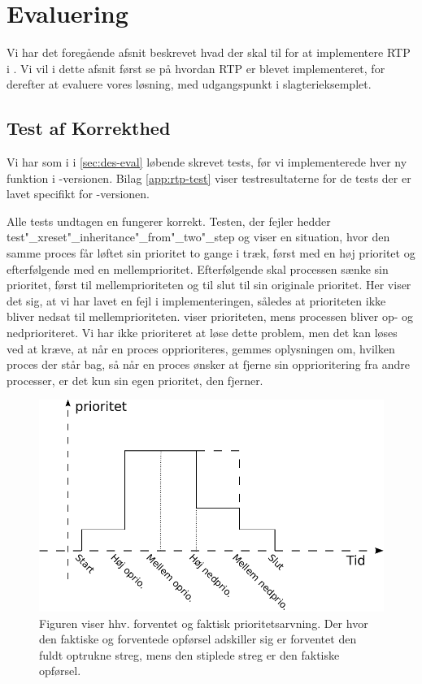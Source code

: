 \section{Evaluering}
Vi har  det foregående afsnit beskrevet hvad der skal til for at implementere RTP i \pycsp. Vi vil i dette afsnit først se på hvordan RTP er blevet implementeret, for derefter at evaluere vores løsning, med udgangspunkt i slagterieksemplet.
\subsection{Test af Korrekthed}
Vi har som i \des i \cref{sec:des-eval} løbende skrevet tests, før vi implementerede hver ny funktion i -versionen.  Bilag \ref{app:rtp-test} viser testresultaterne for de tests der er lavet specifikt for -versionen.

 Alle tests undtagen en fungerer korrekt. Testen, der fejler hedder test"_xreset"_inheritance"_from"_two"_step og viser en situation, hvor den samme proces får løftet sin prioritet to gange i træk, først med en høj prioritet og efterfølgende med en mellemprioritet. Efterfølgende skal processen sænke sin prioritet, først til  mellemprioriteten og til slut til sin originale prioritet. Her viser det sig, at vi har lavet en fejl i implementeringen, således at prioriteten ikke bliver nedsat til mellemprioriteten.  viser prioriteten, mens processen bliver op- og nedprioriteret. Vi har ikke prioriteret at løse dette problem, men det kan løses ved at kræve, at når en proces opprioriteres, gemmes oplysningen om, hvilken proces der står bag, så når en proces ønsker at fjerne sin opprioritering fra andre processer, er det kun sin egen  prioritet, den fjerner.  
 
  
\begin{figure}
 \begin{center}
  \includegraphics[scale=1]{images/priority-inheritance}
	\caption{Figuren viser hhv. forventet og faktisk prioritetsarvning. Der hvor den faktiske og forventede opførsel adskiller sig er forventet den fuldt optrukne streg, mens den stiplede streg er den faktiske opførsel.}
	\label{fig:priority-inheritance}
\end{center}
\end{figure}
  


